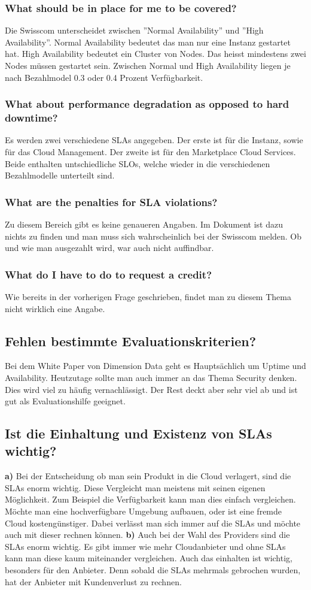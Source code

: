 \subsubsection{What should be in place for me to be covered?}
Die Swisscom unterscheidet zwischen ''Normal Availability'' und ''High Availability''. Normal Availability bedeutet das man nur eine Instanz gestartet hat. High Availability bedeutet ein Cluster von Nodes. Das heisst mindestens zwei Nodes müssen gestartet sein. Zwischen Normal und High Availability liegen je nach Bezahlmodel 0.3 oder 0.4 Prozent Verfügbarkeit.
\subsubsection{What about performance degradation as opposed to hard downtime?}
Es werden zwei verschiedene SLAs angegeben. Der erste ist für die Instanz, sowie für das Cloud Management. Der zweite ist für den Marketplace Cloud Services. Beide enthalten untschiedliche SLOs, welche wieder in die verschiedenen Bezahlmodelle unterteilt sind.
\subsubsection{What are the penalties for SLA violations?}
Zu diesem Bereich gibt es keine genaueren Angaben. Im Dokument ist dazu nichts zu finden und man muss sich wahrscheinlich bei der Swisscom melden. Ob und wie man ausgezahlt wird, war auch nicht auffindbar.
\subsubsection{What do I have to do to request a credit?}
Wie bereits in der vorherigen Frage geschrieben, findet man zu diesem Thema nicht wirklich eine Angabe.
\subsection{Fehlen bestimmte Evaluationskriterien?}
Bei dem White Paper von Dimension Data geht es Hauptsächlich um Uptime und Availability. Heutzutage sollte man auch immer an das Thema Security denken. Dies wird viel zu häufig vernachlässigt. Der Rest deckt aber sehr viel ab und ist gut als Evaluationshilfe geeignet. 
\subsection{Ist die Einhaltung und Existenz von SLAs wichtig?}
\textbf{a)}
Bei der Entscheidung ob man sein Produkt in die Cloud verlagert, sind die SLAs enorm wichtig. Diese Vergleicht man meistens mit seinen eigenen Möglichkeit. Zum Beispiel die Verfügbarkeit kann man dies einfach vergleichen. Möchte man eine hochverfügbare Umgebung aufbauen, oder ist eine fremde Cloud kostengünstiger. Dabei verlässt man sich immer auf die SLAs und möchte auch mit dieser rechnen können. 
\textbf{b)}
Auch bei der Wahl des Providers sind die SLAs enorm wichtig. Es gibt immer wie mehr Cloudanbieter und ohne SLAs kann man diese kaum miteinander vergleichen. Auch das einhalten ist wichtig, besonders für den Anbieter. Denn sobald die SLAs mehrmals gebrochen wurden, hat der Anbieter mit Kundenverlust zu rechnen.
